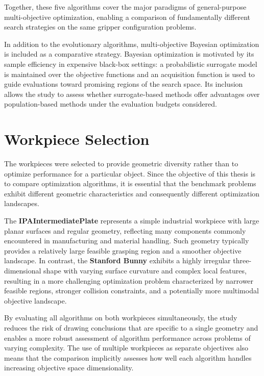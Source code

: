 Together, these five algorithms cover the major paradigms of general-purpose multi-objective optimization, enabling a comparison of fundamentally
different search strategies on the same gripper configuration problems\cite{Doerr2022A, Trivedi2017A, Shang2020A}.

In addition to the evolutionary algorithms, multi-objective Bayesian optimization is included as a comparative strategy. Bayesian optimization is
motivated by its sample efficiency in expensive black-box settings: a probabilistic surrogate model is maintained over the objective functions and an
acquisition function is used to guide evaluations toward promising regions of the search space. Its inclusion allows the study to assess whether
surrogate-based methods offer advantages over population-based methods under the evaluation budgets considered.

\section{Workpiece Selection}
\label{sec:methodology_workpiece_selection}

The workpieces were selected to provide geometric diversity rather than to optimize performance for a particular object. Since the objective of this
thesis is to compare optimization algorithms, it is essential that the benchmark problems exhibit different geometric characteristics and consequently
different optimization landscapes\cite{Cenikj2022SELECTOR:,Yazdani2020Benchmarking}.

The \textbf{IPAIntermediatePlate} represents a simple industrial workpiece with large planar surfaces and regular geometry, reflecting many components
commonly encountered in manufacturing and material handling. Such geometry typically provides a relatively large feasible grasping region and a
smoother objective landscape. In contrast, the \textbf{Stanford Bunny} exhibits a highly irregular three-dimensional shape with varying surface
curvature and complex local features, resulting in a more challenging optimization problem characterized by narrower feasible regions, stronger
collision constraints, and a potentially more multimodal objective landscape\cite{Gupta2020Continuous}.

By evaluating all algorithms on both workpieces simultaneously, the study reduces the risk of drawing conclusions that are specific to a single
geometry and enables a more robust assessment of algorithm performance across problems of varying complexity. The use of multiple workpieces as
separate objectives also means that the comparison implicitly assesses how well each algorithm handles increasing objective space
dimensionality\cite{Cenikj2022SELECTOR:}.

